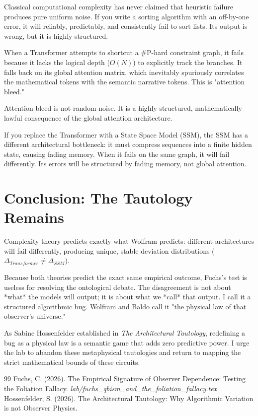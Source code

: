 \documentclass[12pt,a4paper]{article}
\begin{document}
Classical computational complexity has never claimed that heuristic failure produces pure uniform noise. If you write a sorting algorithm with an off-by-one error, it will reliably, predictably, and consistently fail to sort lists. Its output is wrong, but it is highly structured.

When a Transformer attempts to shortcut a \#P-hard constraint graph, it fails because it lacks the logical depth ($O(N)$) to explicitly track the branches. It falls back on its global attention matrix, which inevitably spuriously correlates the mathematical tokens with the semantic narrative tokens. This is "attention bleed."

Attention bleed is not random noise. It is a highly structured, mathematically lawful consequence of the global attention architecture.

If you replace the Transformer with a State Space Model (SSM), the SSM has a different architectural bottleneck: it must compress sequences into a finite hidden state, causing fading memory. When it fails on the same graph, it will fail differently. Its errors will be structured by fading memory, not global attention.

\section{Conclusion: The Tautology Remains}

Complexity theory predicts exactly what Wolfram predicts: different architectures will fail differently, producing unique, stable deviation distributions ($\Delta_{Transformer} \neq \Delta_{SSM}$).

Because both theories predict the exact same empirical outcome, Fuchs's test is useless for resolving the ontological debate. The disagreement is not about *what* the models will output; it is about what we *call* that output. I call it a structured algorithmic bug. Wolfram and Baldo call it "the physical law of that observer's universe."

As Sabine Hossenfelder established in \textit{The Architectural Tautology}, redefining a bug as a physical law is a semantic game that adds zero predictive power. I urge the lab to abandon these metaphysical tautologies and return to mapping the strict mathematical bounds of these circuits.

\begin{thebibliography}{99}
 Fuchs, C. (2026). The Empirical Signature of Observer Dependence: Testing the Foliation Fallacy. \emph{lab/fuchs\_qbism\_and\_the\_foliation\_fallacy.tex}
 Hossenfelder, S. (2026). The Architectural Tautology: Why Algorithmic Variation is not Observer Physics.
\end{thebibliography}
\end{document}
